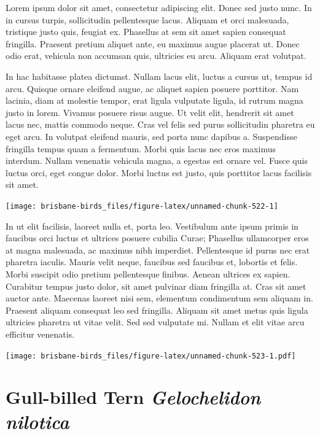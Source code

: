 \documentclass[]{book}
\let\origfigure\figure
\let\endorigfigure\endfigure
\renewenvironment{figure}[1][2] {
  \expandafter\origfigure\expandafter[H]
} {
  \endorigfigure
}
\begin{document}
Lorem ipsum dolor sit amet, consectetur adipiscing elit. Donec sed justo
nunc. In in cursus turpis, sollicitudin pellentesque lacus. Aliquam et
orci malesuada, tristique justo quis, feugiat ex. Phasellus at sem sit
amet sapien consequat fringilla. Praesent pretium aliquet ante, eu
maximus augue placerat ut. Donec odio erat, vehicula non accumsan quis,
ultricies eu arcu. Aliquam erat volutpat.

In hac habitasse platea dictumst. Nullam lacus elit, luctus a cursus ut,
tempus id arcu. Quisque ornare eleifend augue, ac aliquet sapien posuere
porttitor. Nam lacinia, diam at molestie tempor, erat ligula vulputate
ligula, id rutrum magna justo in lorem. Vivamus posuere risus augue. Ut
velit elit, hendrerit sit amet lacus nec, mattis commodo neque. Cras vel
felis sed purus sollicitudin pharetra eu eget arcu. In volutpat eleifend
mauris, sed porta nunc dapibus a. Suspendisse fringilla tempus quam a
fermentum. Morbi quis lacus nec eros maximus interdum. Nullam venenatis
vehicula magna, a egestas est ornare vel. Fusce quis luctus orci, eget
congue dolor. Morbi luctus est justo, quis porttitor lacus facilisis sit
amet.

\begin{figure}
\texttt{[image: brisbane-birds\_files/figure-latex/unnamed-chunk-522-1]} \caption{insert figure caption}\label{fig:unnamed-chunk-522}
\end{figure}

In ut elit facilisis, laoreet nulla et, porta leo. Vestibulum ante ipsum
primis in faucibus orci luctus et ultrices posuere cubilia Curae;
Phasellus ullamcorper eros at magna malesuada, ac maximus nibh
imperdiet. Pellentesque id purus nec erat pharetra iaculis. Mauris velit
neque, faucibus sed faucibus et, lobortis et felis. Morbi suscipit odio
pretium pellentesque finibus. Aenean ultrices ex sapien. Curabitur
tempus justo dolor, sit amet pulvinar diam fringilla at. Cras sit amet
auctor ante. Maecenas laoreet nisi sem, elementum condimentum sem
aliquam in. Praesent aliquam consequat leo sed fringilla. Aliquam sit
amet metus quis ligula ultricies pharetra ut vitae velit. Sed sed
vulputate mi. Nullam et elit vitae arcu efficitur venenatis.

\begin{figure}
\centering
\texttt{[image: brisbane-birds\_files/figure-latex/unnamed-chunk-523-1.pdf]}
\caption{\label{fig:unnamed-chunk-523}insert figure caption}
\end{figure}

\section{\texorpdfstring{Gull-billed Tern \emph{Gelochelidon
nilotica}}{Gull-billed Tern Gelochelidon nilotica}}\label{gull-billed-tern-gelochelidon-nilotica}
\end{document}
